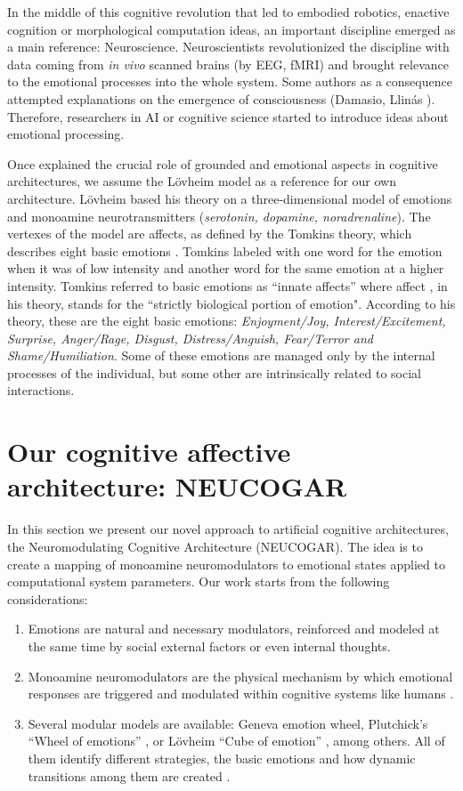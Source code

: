 \documentclass[procedia]{easychair}
\begin{document}
In the middle of this cognitive revolution that led to embodied robotics, enactive cognition or morphological
computation ideas, an important discipline emerged as a main reference: Neuroscience.
Neuroscientists revolutionized the discipline with data coming from \emph{in vivo} scanned brains (by EEG, fMRI)
and brought relevance to the emotional processes into the whole system.  Some authors as a consequence attempted
explanations on the emergence of consciousness (Damasio, Llin{\'a}s \cite{Lli}). Therefore, researchers in AI
or cognitive science started to introduce ideas about emotional processing.

Once explained the crucial role of grounded and emotional aspects in cognitive architectures, we assume the
L{\"o}vheim model as a reference for our own architecture. L{\"o}vheim \cite{lovheim2012} based his theory on
a three-dimensional model of emotions and monoamine neurotransmitters (\textit{serotonin, dopamine, noradrenaline}).
The vertexes of
the model are affects, as defined by the Tomkins theory, which describes eight basic emotions
\cite{kelly2009}. Tomkins labeled with one word for the emotion when it was of low intensity and
another word for the same emotion at a higher intensity. Tomkins referred to basic emotions as ``innate affects''
where affect \cite{tomkins1962, tomkins1963, tomkins1991}, in his theory, stands for the ``strictly biological portion of emotion".
According to his theory, these are the eight basic emotions: \textit{Enjoyment/Joy, Interest/Excitement,
Surprise, Anger/Rage, Disgust, Distress/Anguish, Fear/Terror and Shame/Humiliation}.
Some of these emotions are managed only by the internal processes of the individual, but some other
are intrinsically related to social interactions.

\section{Our cognitive affective architecture: NEUCOGAR}
\label{sec:neucogar}

In this section we present our novel approach to artificial cognitive architectures, the Neuromodulating Cognitive
Architecture (NEUCOGAR). The idea is to create a mapping of monoamine neuromodulators to emotional states
applied to computational system parameters. Our work starts from the following considerations:

\begin{enumerate}
\item Emotions are natural and necessary modulators, reinforced and modeled at the same time by social external
factors or even internal thoughts.
\item Monoamine neuromodulators are the physical mechanism by which emotional responses
are triggered and modulated within cognitive systems like humans \cite{marsella2003, marsella2010}.
\item
Several modular models are available: Geneva emotion wheel, Plutchick's ``Wheel of emotions'' \cite{plutchik2001},
or L{\"o}vheim ``Cube of emotion'' \cite{lovheim2012}, among others. All of them identify different
strategies, the basic emotions and how dynamic transitions among them are created \cite{gratch2005}.
\end{enumerate}
\end{document}
